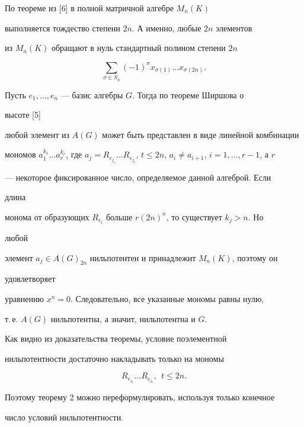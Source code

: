 \begin{pf} 


По теореме из [6] в полной матричной алгебре $M_n(K)$ 


выполняется тождество степени $2n$. А именно, любые $2n$ элементов 


из $M_n(K)$ обращают в нуль стандартный полином степени $2n$ 


$$ 


\sum_{\sigma\in S_n}(-1)^\sigma 


x_{\sigma(1)}\dotsc x_{\sigma(2n)}. 


$$ 


Пусть $e_1,\dotsc,e_n$ --- базис алгебры $G$. Тогда по теореме Ширшова о 


высоте [5] 


любой элемент из $A(G)$ может быть представлен в виде линейной комбинации 


мономов $a^{k_1}_1\dotsc a^{k_r}_r$, где $a_j=R_{e_{j_1}}\dotsc 


R_{e_{j_t}}$, $t\le2n$, $a_i\ne a_{i+1}$, $i=1,\dotsc,r-1$, а $r$ 


--- некоторое фиксированное число, определяемое данной алгеброй. Если 


длина 


монома от образующих $R_{e_i}$ больше $r(2n)^n$, то существует $k_j>n$. Но 


любой 


элемент $a_j\in A(G)_{2n}$ нильпотентен и принадлежит $M_n(K)$, поэтому он 


удовлетворяет 


уравнению $x^n=0$. Следовательно, все указанные мономы равны нулю, 


т.\,е. $A(G)$ нильпотентна, а значит, нильпотентна и $G$. 


\end{pf} 


 


Как видно из доказательства теоремы, условие поэлементной 


нильпотентности достаточно накладывать только на мономы 


$$ 


R_{e_{i_1}}\dotsc R_{e_{i_t}},\ \ t\le2n. 


$$ 


Поэтому теорему 2 можно переформулировать, используя только конечное 


число условий нильпотентности. 


